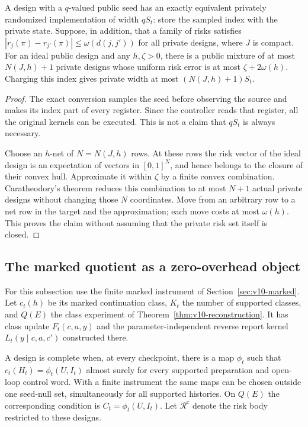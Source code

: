 \begin{proposition}
\label{prop:v11-seed}
A design with a $q$-valued public seed has an exactly equivalent privately
randomized implementation of width $qS_t$: store the sampled index with
the private state. Suppose, in addition, that a family of risks satisfies
$|r_j(\pi)-r_{j'}(\pi)|\le\omega(d(j,j'))$ for all private designs, where
$J$ is compact. For an ideal public design and any $h,\zeta>0$, there is a
public mixture of at most $N(J,h)+1$ private designs whose uniform risk
error is at most $\zeta+2\omega(h)$. Charging this index gives private
width at most $(N(J,h)+1)S_t$.
\end{proposition}

\begin{proof}
The exact conversion samples the seed before observing the source and
makes its index part of every register. Since the controller reads that
register, all the original kernels can be executed. This is not a claim
that $qS_t$ is always necessary.

Choose an $h$-net of $N=N(J,h)$ rows. At these rows the risk vector of the
ideal design is an expectation of vectors in $[0,1]^N$, and hence belongs
to the closure of their convex hull. Approximate it within $\zeta$ by a
finite convex combination. Caratheodory's theorem reduces this combination
to at most $N+1$ actual private designs without changing those $N$
coordinates. Move from an arbitrary row to a net row in the target and
the approximation; each move costs at most $\omega(h)$. This proves the
claim without assuming that the private risk set itself is closed.
\end{proof}

\subsection{The marked quotient as a zero-overhead object}
For this subsection use the finite marked instrument of
Section~\ref{sec:v10-marked}. Let $c_t(h)$ be its marked continuation class,
$K_t$ the number of supported classes, and $Q(E)$ the class experiment of
Theorem~\ref{thm:v10-reconstruction}. It has class update
$F_t(c,a,y)$ and the parameter-independent reverse report kernel
$L_t(y\mid c,a,c')$ constructed there.

\begin{definition}
\label{def:v11-complete}
A design is complete when, at every checkpoint, there is a map
$\phi_t$ such that
$c_t(H_t)=\phi_t(U,I_t)$ almost surely for every supported preparation
and open-loop control word. With a finite instrument the same maps can be
chosen outside one seed-null set, simultaneously for all supported
histories. On $Q(E)$ the corresponding condition is
$C_t=\phi_t(U,I_t)$. Let $\mathcal R^{\mathrm c}$ denote the risk body
restricted to these designs.
\end{definition}

